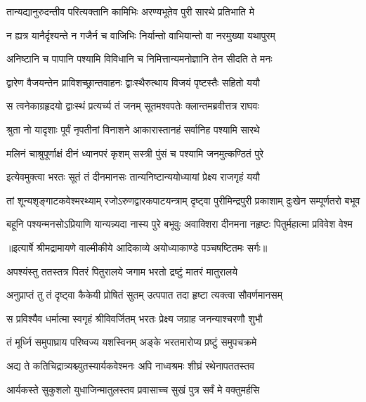 \twolineshloka
{तान्यद्यानुरुदन्तीव परित्यक्तानि कामिभिः}
{अरण्यभूतेव पुरी सारथे प्रतिभाति मे} %

\twolineshloka
{न ह्यत्र यानैर्दृश्यन्ते न गजैर्न च वाजिभिः}
{निर्यान्तो वाभियान्तो वा नरमुख्या यथापुरम्} %

\twolineshloka
{अनिष्टानि च पापानि पश्यामि विविधानि च}
{निमित्तान्यमनोज्ञानि तेन सीदति ते मनः} %

\twolineshloka
{द्वारेण वैजयन्तेन प्राविशच्छ्रान्तवाहनः}
{द्वाःस्थैरुत्थाय विजयं पृष्टस्तैः सहितो ययौ} %

\twolineshloka
{स त्वनेकाग्रहृदयो द्वाःस्थं प्रत्यर्च्य तं जनम्}
{सूतमश्वपतेः क्लान्तमब्रवीत्तत्र राघवः} %

\twolineshloka
{श्रुता नो यादृशाः पूर्वं नृपतीनां विनाशने}
{आकारास्तानहं सर्वानिह पश्यामि सारथे} %

\twolineshloka
{मलिनं चाश्रुपूर्णाक्षं दीनं ध्यानपरं कृशम्}
{सस्त्री पुंसं च पश्यामि जनमुत्कण्ठितं पुरे} %

\twolineshloka
{इत्येवमुक्त्वा भरतः सूतं तं दीनमानसः}
{तान्यनिष्टान्ययोध्यायां प्रेक्ष्य राजगृहं ययौ} %

\fourlineindentedshloka
{तां शून्यशृङ्गाटकवेश्मरथ्याम्}
{रजोऽरुणद्वारकपाटयन्त्राम्}
{दृष्ट्वा पुरीमिन्द्रपुरी प्रकाशाम्}
{दुःखेन सम्पूर्णतरो बभूव} %

\fourlineindentedshloka
{बहूनि पश्यन्मनसोऽप्रियाणि}
{यान्यन्न्यदा नास्य पुरे बभूवुः}
{अवाक्शिरा दीनमना नहृष्टः}
{पितुर्महात्मा प्रविवेश वेश्म} %


{॥इत्यार्षे श्रीमद्रामायणे वाल्मीकीये आदिकाव्ये अयोध्याकाण्डे पञ्चषष्टितमः सर्गः॥}


\twolineshloka
{अपश्यंस्तु ततस्तत्र पितरं पितुरालये}
{जगाम भरतो द्रष्टुं मातरं मातुरालये} %

\twolineshloka
{अनुप्राप्तं तु तं दृष्ट्वा कैकेयी प्रोषितं सुतम्}
{उत्पपात तदा हृष्टा त्यक्त्वा सौवर्णमानसम्} %

\twolineshloka
{स प्रविश्यैव धर्मात्मा स्वगृहं श्रीविवर्जितम्}
{भरतः प्रेक्ष्य जग्राह जनन्याश्चरणौ शुभौ} %

\twolineshloka
{तं मूर्ध्नि समुपाघ्राय परिष्वज्य यशस्विनम्}
{अङ्के भरतमारोप्य प्रष्टुं समुपचक्रमे} %

\twolineshloka
{अद्य ते कतिचिद्रात्र्यश्च्युतस्यार्यकवेश्मनः}
{अपि नाध्वश्रमः शीघ्रं रथेनापततस्तव} %

\twolineshloka
{आर्यकस्ते सुकुशलो युधाजिन्मातुलस्तव}
{प्रवासाच्च सुखं पुत्र सर्वं मे वक्तुमर्हसि} %

